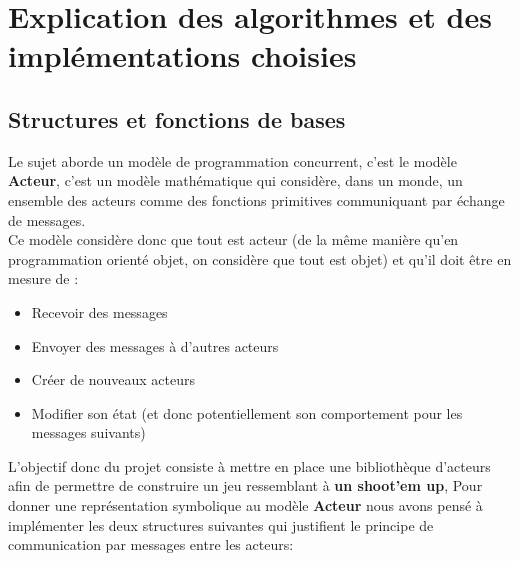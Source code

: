 \documentclass[a4paper,10pt]{article}
\begin{document}
\section{Explication des algorithmes et des implémentations choisies} 
\label{structfonc}
\subsection{Structures et fonctions de bases}
\label{structs}
Le sujet aborde un modèle de programmation concurrent, c'est le modèle \textbf{Acteur}, c'est un modèle mathématique qui considère, dans un monde, un ensemble des acteurs comme des fonctions primitives communiquant par échange de messages.\\
Ce modèle considère donc que tout est acteur (de la même manière qu’en programmation orienté objet, on considère que tout est objet) et qu’il doit être en mesure de :
\begin{itemize}
    \item Recevoir des messages
    \item Envoyer des messages à d’autres acteurs
    \item Créer de nouveaux acteurs
    \item Modifier son état (et donc potentiellement son comportement pour les messages suivants)
\end{itemize}
L'objectif donc du projet consiste à mettre en place une bibliothèque d'acteurs afin de permettre de construire un jeu ressemblant à \textbf{un shoot'em up},
Pour donner une représentation symbolique au modèle \textbf{Acteur} nous avons pensé à implémenter les deux structures suivantes qui justifient le principe de communication par messages entre les acteurs:
\end{document}
